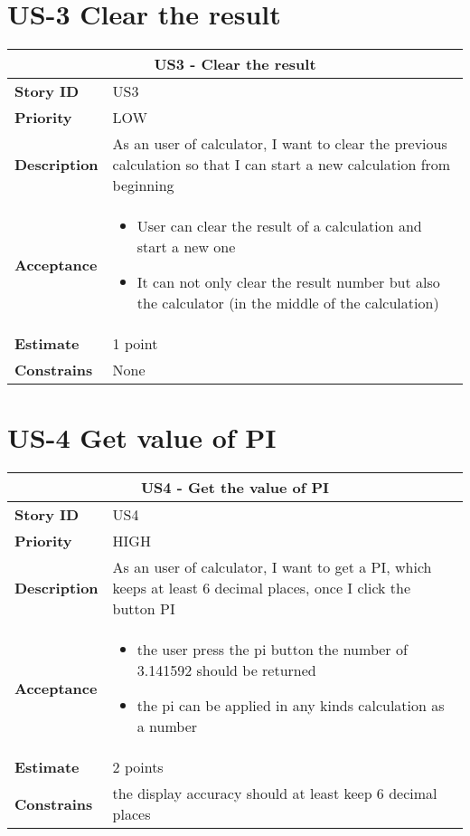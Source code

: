 \documentclass[12pt]{report}
\begin{document}
{\section{US-3 Clear the result }
\begin{tabular}{ |p{4cm}|p{10cm}| }
 \hline
 \multicolumn{2}{|c|}{US3 - Clear the result } \\
 \hline
 \textbf {Story ID}& US3 \\
  \hline
  \textbf{Priority} & LOW \\
 \hline
  \textbf{Description}   & As an user of calculator, I want to clear the previous calculation so that I can start a new calculation from beginning \\
 \hline
 \textbf{Acceptance}& 
  \begin{itemize}
     \item User can clear the result of a calculation and start a new one
     \item It can not only clear the result number but also the calculator (in the middle of the calculation)
\end{itemize}
 
 \\
 \hline
 \textbf{Estimate} & 1 point \\
 \hline
 \textbf{Constrains}& None \\
 \hline
\end{tabular}

\section{US-4 Get value of PI}
\begin{tabular}{ |p{4cm}|p{10cm}| }
 \hline
 \multicolumn{2}{|c|}{US4 - Get the value of PI} \\
 \hline
 \textbf {Story ID}& US4  \\
 \hline
 \textbf{Priority} & HIGH \\
 \hline
 \textbf{Description}   & As an user of calculator, I want to get a PI, which keeps at least 6 decimal places, once I click the button PI \\
 \hline
 \textbf{Acceptance}& 

 \begin{itemize}
     \item  the user press the pi button the number of 3.141592 should be returned
     \item  the pi can be applied in any kinds calculation as a number
\end{itemize}
\\
 \hline
 \textbf{Estimate} & 2 points  \\
 \hline
 \textbf{Constrains}& the display accuracy should at least keep 6 decimal places  \\
 \hline
\end{tabular}

}
\end{document}
